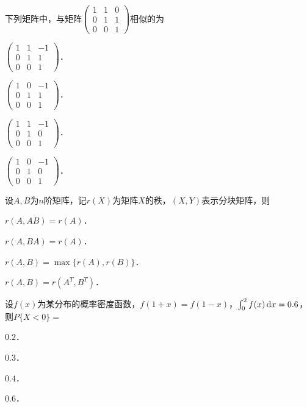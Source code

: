 \documentclass[plain,noanswer,medmath]{../../template/jnuexam}
\begin{document}
\begin{problem}
下列矩阵中，与矩阵$\begin{pmatrix}
  1 & 1 & 0 \\
  0 & 1 & 1 \\
  0 & 0 & 1
\end{pmatrix}$相似的为\pickout{}
\begin{abcd}
\item $\begin{pmatrix}
  1 & 1 & -1 \\
  0 & 1 & 1 \\
  0 & 0 & 1
\end{pmatrix}$．
\item $\begin{pmatrix}
  1 & 0 & -1 \\
  0 & 1 & 1 \\
  0 & 0 & 1
\end{pmatrix}$．
\item $\begin{pmatrix}
  1 & 1 & -1 \\
  0 & 1 & 0 \\
  0 & 0 & 1
\end{pmatrix}$．
\item $\begin{pmatrix}
  1 & 0 & -1 \\
  0 & 1 & 0 \\
  0 & 0 & 1
\end{pmatrix}$．
\end{abcd}
\end{problem}


\begin{problem}
设$A,B$为$n$阶矩阵，记$r(X)$为矩阵$X$的秩，$(X,Y)$表示分块矩阵，则\pickout{}
\begin{abcd}
\item $r(A,AB) = r(A)$．
\item $r(A,BA) = r(A)$．
\item $r(A,B) = \max\{r(A),r(B)\}$．
\item $r(A,B) = r(A^T,B^T)$．
\end{abcd}
\end{problem}


\begin{problem}
设$f(x)$为某分布的概率密度函数，$f\left(1 + x \right) = f(1 - x)$，$\int_0^2 f(x)\mathop{}\!\mathrm{d} x = 0.6$，
则$P\{X < 0\} =$\pickout{}
\begin{abcd}
\item $0.2$．
\item $0.3$．
\item $0.4$．
\item $0.6$．
\end{abcd}
\end{problem}
\end{document}
